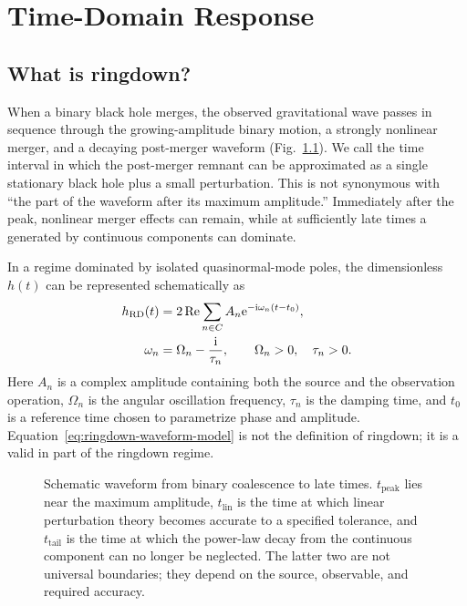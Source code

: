 \chapter{Time-Domain Response}
\label{chap:time-response}

\section{What is ringdown?}

When a binary black hole merges, the observed gravitational wave passes in sequence through the growing-amplitude binary motion, a strongly nonlinear merger, and a decaying post-merger waveform (Fig.~\ref{fig:ringdown-regimes}). We call  the time interval in which the post-merger remnant can be approximated as a single stationary black hole plus a small perturbation. This is not synonymous with ``the part of the waveform after its maximum amplitude.'' Immediately after the peak, nonlinear merger effects can remain, while at sufficiently late times a  generated by continuous components can dominate.

In a regime dominated by isolated quasinormal-mode poles, the dimensionless  $h(t)$ can be represented schematically as
\begin{align}
h_{\mathrm{RD}}(t)
&=
2\operatorname{Re}\sum_{n\in C}
A_n\mathrm{e}^{-\mathrm{i}\omega_n(t-t_0)},
\label{eq:ringdown-waveform-model}
\\
\omega_n
&=
\Omega_n-\frac{\mathrm{i}}{\tau_n},
\qquad
\Omega_n>0,
\quad
\tau_n>0.
\label{eq:ringdown-frequency-decay}
\end{align}
Here $A_n$ is a complex amplitude containing both the source and the observation operation, $\Omega_n$ is the angular oscillation frequency, $\tau_n$ is the damping time, and $t_0$ is a reference time chosen to parametrize phase and amplitude. Equation~\eqref{eq:ringdown-waveform-model} is not the definition of ringdown; it is a  valid in part of the ringdown regime.

\begin{figure}[tbp]
\centering
\resizebox{\linewidth}{!}{}
\caption{Schematic waveform from binary coalescence to late times. $t_{\mathrm{peak}}$ lies near the maximum amplitude, $t_{\mathrm{lin}}$ is the time at which linear perturbation theory becomes accurate to a specified tolerance, and $t_{\mathrm{tail}}$ is the time at which the power-law decay from the continuous component can no longer be neglected. The latter two are not universal boundaries; they depend on the source, observable, and required accuracy.}
\label{fig:ringdown-regimes}
\end{figure}

